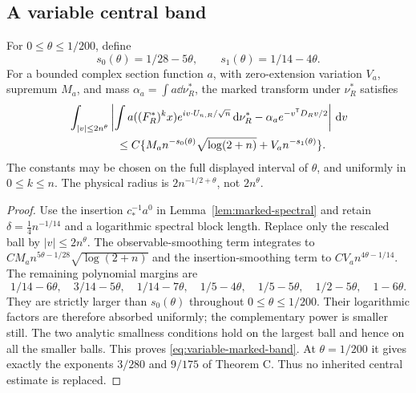 \subsection{A variable central band}
\begin{lemma}
\label{lem:variable-marked-band}
For $0\le\theta\le1/200$, define
\[
 s_0(\theta)=1/28-5\theta,\qquad
 s_1(\theta)=1/14-4\theta.
\]
For a bounded complex section function $a$, with zero-extension
variation $V_a$, supremum $M_a$, and mass
$\alpha_a=\int a\dd\nu_R^*$, the marked transform under $\nu_R^*$
satisfies
\begin{align}
 &\int_{|v|\le2n^\theta}
 \left|\int a((F_R^*)^kx)e^{iv\cdot U_{n,R}/\sqrt n}\dd\nu_R^*
                 -\alpha_a e^{-v^{\mathsf T}D_Rv/2}\right|\dd v
 \notag\\
 &\hspace{15mm}\le C\{M_a n^{-s_0(\theta)}\sqrt{\log(2+n)}
                           +V_a n^{-s_1(\theta)}\}.
       \label{eq:variable-marked-band}
\end{align}
The constants may be chosen on the full displayed interval of $\theta$,
and uniformly in $0\le k\le n$. The physical radius is
$2n^{-1/2+\theta}$, not $2n^\theta$.
\end{lemma}
\begin{proof}
Use the insertion $c_*^{-1}a^0$ in
Lemma~\ref{lem:marked-spectral} and retain
$\delta=\tfrac14n^{-1/14}$ and a logarithmic spectral block length.
Replace only the rescaled ball by $|v|\le2n^\theta$.
The observable-smoothing term integrates to
$C M_a n^{5\theta-1/28}\sqrt{\log(2+n)}$ and the insertion-smoothing
term to $CV_a n^{4\theta-1/14}$.
The remaining polynomial margins are
\[
 1/14-6\theta,\quad 3/14-5\theta,\quad 1/14-7\theta,
 \quad 1/5-4\theta,\quad 1/5-5\theta,
 \quad 1/2-5\theta,\quad 1-6\theta.
\]
They are strictly larger than $s_0(\theta)$ throughout
$0\le\theta\le1/200$. Their logarithmic factors are therefore
absorbed uniformly; the complementary power is smaller still. The two
analytic smallness conditions hold on the largest ball and hence on
all the smaller balls. This proves \eqref{eq:variable-marked-band}.
At $\theta=1/200$ it gives exactly the exponents $3/280$ and $9/175$
of Theorem C. Thus no inherited central estimate is replaced.
\end{proof}

